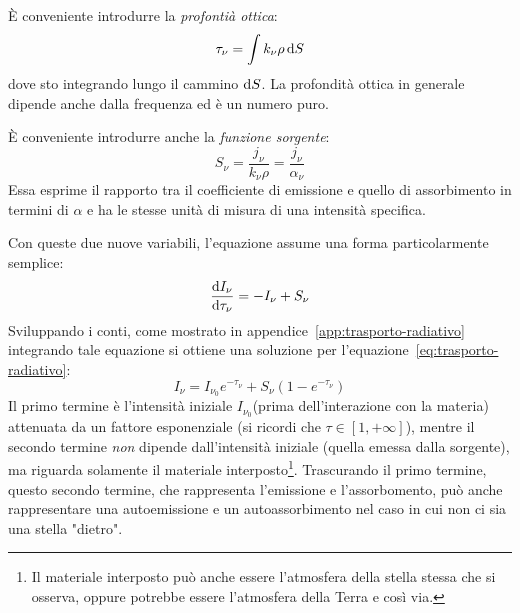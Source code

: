 È conveniente introdurre la \emph{profontià ottica}:
\begin{equation}\label{eq:profondità-ottica}
        \tau_\nu = \int k_\nu \rho \mathop{}\!\mathrm{d} S
\end{equation}
dove sto integrando lungo il cammino $\mathop{}\!\mathrm{d} S$. La profondità ottica in generale dipende anche dalla frequenza ed è un numero puro. 

È conveniente introdurre anche la \emph{funzione sorgente}:
\begin{equation}\label{eq:funzione-sorgente}
    S_\nu = \frac{j_\nu}{k_\nu \rho} = \frac{j_\nu}{\alpha_\nu}
\end{equation}
Essa esprime il rapporto tra il coefficiente di emissione e quello di assorbimento in termini di $\alpha$ e ha le stesse unità di misura di una intensità specifica.

Con queste due nuove variabili, l'equazione assume una forma particolarmente semplice:
\begin{equation}\label{eq:trasporto-radiativo3}
    \frac{\mathop{}\!\mathrm{d} I_\nu}{\mathop{}\!\mathrm{d} \tau_\nu} = -I_\nu + S_\nu
\end{equation}
Sviluppando i conti, come mostrato in appendice~\ref{app:trasporto-radiativo} integrando tale equazione si ottiene una soluzione per l'equazione~\eqref{eq:trasporto-radiativo}:
\begin{equation}\label{eq:soluzione-trasporto-radiativo}
    I_\nu = I_{\nu_0} e^{-\tau_\nu} + S_\nu (1- e^{-\tau_\nu})
\end{equation}
Il primo termine è l'intensità iniziale $I_{\nu_0}$(prima dell'interazione con la materia) attenuata da un fattore esponenziale (si ricordi che $\tau \in [1,+\infty]$), mentre il secondo termine \emph{non} dipende dall'intensità iniziale (quella emessa dalla sorgente), ma riguarda solamente il materiale interposto\footnote{Il materiale interposto può anche essere l'atmosfera della stella stessa che si osserva, oppure potrebbe essere l'atmosfera della Terra e così via.}. Trascurando il primo termine, questo secondo termine, che rappresenta l'emissione e l'assorbomento, può anche rappresentare una autoemissione e un autoassorbimento nel caso in cui non ci sia una stella "dietro".

